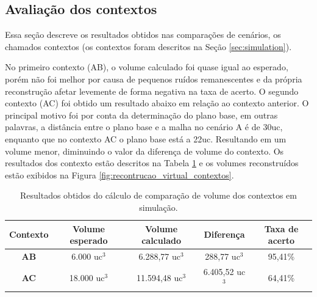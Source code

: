 \subsection{Avaliação dos contextos}
\label{sec:avaliacao_contextos}

Essa seção descreve os resultados obtidos nas comparações de cenários, os chamados contextos (os contextos foram descritos na Seção \ref{sec:simulation}).

No primeiro contexto (AB), o volume calculado foi quase igual ao esperado, porém não foi melhor por causa de pequenos ruídos remanescentes e da própria reconstrução afetar levemente de forma negativa na taxa de acerto.
O segundo contexto (AC) foi obtido um resultado abaixo em relação ao contexto anterior.
O principal motivo foi por conta da determinação do plano base, em outras palavras, a distância entre o plano base e a malha no cenário A é de 30uc, enquanto que no contexto AC o plano base está a 22uc.
Resultando em um volume menor, diminuindo o valor da diferença de volume do contexto.
Os resultados dos contexto estão descritos na Tabela \ref{tab:tabela_resultados_contextos_sim} e os volumes reconstruídos estão exibidos na Figura \ref{fig:recontrucao_virtual_contextos}.

\begin{table}[H]
    \centering
    \caption{Resultados obtidos do cálculo de comparação de volume dos contextos em simulação.}
    \begin{tabular}{ccccc}
        \toprule
        \textbf{Contexto} & \textbf{Volume esperado} & \textbf{Volume calculado} & \textbf{Diferença} & \textbf{Taxa de acerto} \\ \midrule
        \textbf{AB} & 6.000 uc$^3$ & 6.288,77 uc$^3$ & 288,77 uc$^3$ & 95,41\% \\
        \textbf{AC} & 18.000 uc$^3$ & 11.594,48 uc$^3$ & 6.405,52 uc$^3$ & 64,41\% \\ \bottomrule
    \end{tabular}
    \label{tab:tabela_resultados_contextos_sim}
\end{table}


